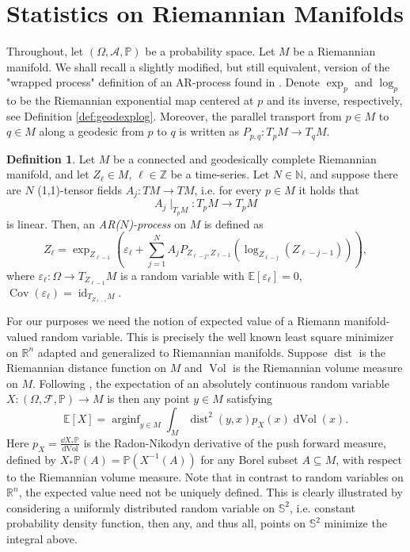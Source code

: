 \documentclass[12pt,a4paper]{article}
\theoremstyle{definition}
\newtheorem{definition}[theorem]{Definition}
\theoremstyle{remark}
\DeclareMathOperator{\Cov}{Cov}
\DeclareMathOperator*{\arginf}{arginf}
\DeclareMathOperator{\dist}{dist}
\DeclareMathOperator{\Vol}{Vol}
\DeclareMathOperator{\dVol}{dVol}
\DeclareMathOperator{\id}{id}
\begin{document}
\section{Statistics on Riemannian Manifolds}
\label{sec:AutRM}

Throughout, let $(\Omega, \mathcal{A},\mathbb{P})$ be a probability space. Let $M$ be a Riemannian manifold. We shall recall a slightly modified, but still equivalent, version of the "wrapped process" definition of an AR-process found in \cite{xavier2006generalization}. Denote $\exp_p$ and $\log_p$ to be the Riemannian exponential map centered at $p$ and its inverse, respectively, see Definition \ref{def:geodexplog}. Moreover, the parallel transport from $p\in M$ to $q\in M$ along a geodesic from $p$ to $q$ is written as $P_{p,q}:T_pM\rightarrow T_q M$.

\begin{definition}
\label{def:arprocess}
Let $M$ be a connected and geodesically complete Riemannian manifold, and let $Z_\ell\in M$, $\ell\in \mathbb{Z}$ be a time-series. Let $N \in \mathbb{N}$, and suppose there are $N$ (1,1)-tensor fields $A_j:TM\rightarrow TM$, i.e. for every $p\in M$ it holds that
\[
A_j\mid_{T_p M}:T_pM \rightarrow T_pM
\]
is linear. Then, an \emph{AR($N$)-process} on $M$ is defined as
\[
Z_\ell = \exp_{Z_{\ell-1}}\left(\varepsilon_\ell+ \sum_{j=1}^N A_j P_{Z_{\ell-j},Z_{\ell-1}}( \log_{Z_{\ell-j}}(Z_{\ell-j-1})) \right),
\]
where $\varepsilon_\ell:\Omega \rightarrow T_{Z_{\ell-1}}M$ is a random variable with $\mathbb{E}[\varepsilon_\ell]=0$, $\Cov(\varepsilon_\ell)=\id_{T_{Z_{\ell-1}}M}$.
\end{definition}

For our purposes we need the notion of expected value of a Riemann manifold-valued random variable. This is precisely the well known least square minimizer on $\mathbb{R}^n$ adapted and generalized to Riemannian manifolds. Suppose $\dist$ is the Riemannian distance function on $M$ and $\Vol$ is the Riemannian volume measure on $M$. Following \cite{dubey2019frechet,pennec2006intrinsic}, the expectation of an absolutely continuous random variable $X:(\Omega,\mathcal{F},\mathbb{P}) \rightarrow M$ is then any point $y\in M$ satisfying
\begin{equation}
\mathbb{E}[X] = \arginf_{y\in M} \int_M \dist^2(y,x)p_X(x) \dVol(x).
\label{eq:expectation}
\end{equation}
Here $p_X = \frac{\dd X_*\mathbb{P}}{\dVol}$ is the Radon-Nikodyn derivative of the push forward measure, defined by $X_*\mathbb{P}(A)= \mathbb{P}(X^{-1}(A))$ for any Borel subset $A\subseteq M$, with respect to the Riemannian volume measure. Note that in contrast to random variables on $\mathbb{R}^n$, the expected value need not be uniquely defined. This is clearly illustrated by considering a uniformly distributed random variable on $\mathbb{S}^2$, i.e. constant probability density function, then any, and thus all, points on $\mathbb{S}^2$ minimize the integral above.
\end{document}
